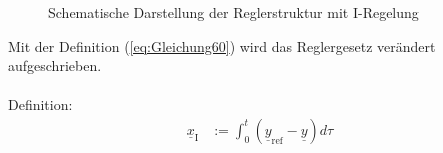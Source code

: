 \begin{figure}[H]
    \centering
    \caption[Reglerstruktur I-Regelung]{Schematische Darstellung der Reglerstruktur mit I-Regelung}
    \label{fig:Bild11}
\end{figure}

Mit der Definition (\autoref{eq:Gleichung60}) wird das Reglergesetz verändert aufgeschrieben.\\\\
Definition:
\begin{align}\label{eq:Gleichung60}
    \underline{x}_{\mathrm{I}}& :=\int_{0}^t(\underline{y}_{\mathrm{ref}}-\underline{y})d\tau
\end{align}

\clearpage

